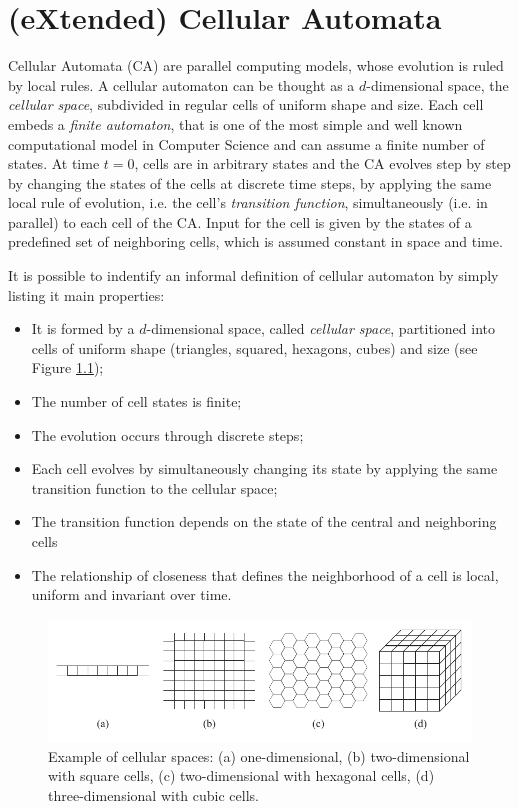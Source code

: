 \chapter{(eXtended) Cellular Automata}

Cellular Automata (CA) are parallel computing models, whose evolution
is ruled by local rules. A cellular automaton can be thought as a
$d$-dimensional space, the \emph{cellular space}, subdivided in
regular cells of uniform shape and size. Each cell embeds a
\emph{finite automaton}, that is one of the most simple and well known
computational model in Computer Science and can assume a finite number
of states. At time $t=0$, cells are in arbitrary states and the CA
evolves step by step by changing the states of the cells at discrete
time steps, by applying the same local rule of evolution, i.e. the
cell's \emph{transition function}, simultaneously (i.e. in parallel)
to each cell of the CA. Input for the cell is given by the states of a
predefined set of neighboring cells, which is assumed constant in
space and time.

It is possible to indentify an informal definition of cellular
automaton by simply listing it main properties:

\begin{itemize}
\item It is formed by a $d$-dimensional space, called \emph{cellular
  space}, partitioned into cells of uniform shape (triangles, squared,
  hexagons, cubes) and size (see Figure \ref{fig:cellularspaces});
\item The number of cell states is finite;
\item The evolution occurs through discrete steps;
\item Each cell evolves by simultaneously changing its state by
  applying the same transition function to the cellular space;
\item The transition function depends on the state of the central and
  neighboring cells
\item The relationship of closeness that defines the neighborhood of a
  cell is local, uniform and invariant over time.
\end{itemize}

\begin{figure}
  \begin{center}
    \includegraphics[width=12cm]{./images/CellularAutomata/cellularspaces}
    \caption{Example of cellular spaces: (a) one-dimensional, (b)
      two-dimensional with square cells, (c) two-dimensional with
      hexagonal cells, (d) three-dimensional with cubic cells.}
    \label{fig:cellularspaces}
  \end{center}
\end{figure}

